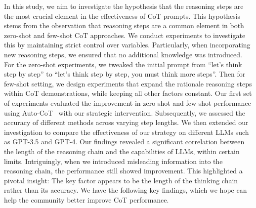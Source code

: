 In this study, we aim to investigate the hypothesis that the reasoning steps are the most crucial element in the effectiveness of CoT prompts. This hypothesis stems from the observation that reasoning steps are a common element in both zero-shot and few-shot CoT approaches. We conduct experiments to investigate this by maintaining strict control over variables. Particularly, when incorporating new reasoning steps, we ensured that no additional knowledge was introduced. For the zero-shot experiments, we tweaked the initial prompt from ``let's think step by step'' to ``let's think step by step, you must think more steps''. Then for few-shot setting, we design experiments that expand the rationale reasoning steps within CoT demonstrations, while keeping all other factors constant.
Our first set of experiments evaluated the improvement in zero-shot and few-shot performance using Auto-CoT~\cite{zhang2022automatic} with our strategic intervention. Subsequently, we assessed the accuracy of different methods across varying step lengths. We then extended our investigation to compare the effectiveness of our strategy on different LLMs such as GPT-3.5 and GPT-4. Our findings revealed a significant correlation between the length of the reasoning chain and the capabilities of LLMs, within certain limits. Intriguingly, when we introduced misleading information into the reasoning chain, the performance still showed improvement. This highlighted a pivotal insight: The key factor appears to be the length of the thinking chain rather than its accuracy.
We have the following key findings, which we hope can help the community better improve CoT performance.
